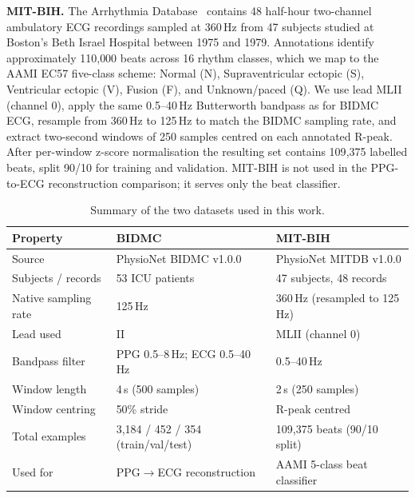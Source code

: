 \documentclass[11pt,a4paper]{article}
\begin{document}
\textbf{MIT-BIH.} The Arrhythmia Database~\cite{moody2001mitbih} contains 48 half-hour two-channel ambulatory ECG recordings sampled at 360\,Hz from 47 subjects studied at Boston's Beth Israel Hospital between 1975 and 1979. Annotations identify approximately 110{,}000 beats across 16 rhythm classes, which we map to the AAMI EC57 five-class scheme: Normal (N), Supraventricular ectopic (S), Ventricular ectopic (V), Fusion (F), and Unknown/paced (Q). We use lead MLII (channel 0), apply the same 0.5--40\,Hz Butterworth bandpass as for BIDMC ECG, resample from 360\,Hz to 125\,Hz to match the BIDMC sampling rate, and extract two-second windows of 250 samples centred on each annotated R-peak. After per-window z-score normalisation the resulting set contains 109{,}375 labelled beats, split 90/10 for training and validation. MIT-BIH is not used in the PPG-to-ECG reconstruction comparison; it serves only the beat classifier.

\begin{table}[H]
  \centering
  \caption{Summary of the two datasets used in this work.}
  \label{tab:data}
  \small
  \begin{tabular}{p{3.6cm} p{5.2cm} p{5.2cm}}
    \toprule
    \textbf{Property} & \textbf{BIDMC} & \textbf{MIT-BIH} \\
    \midrule
    Source              & PhysioNet BIDMC v1.0.0           & PhysioNet MITDB v1.0.0 \\
    Subjects / records  & 53 ICU patients                  & 47 subjects, 48 records \\
    Native sampling rate& 125\,Hz                          & 360\,Hz (resampled to 125\,Hz) \\
    Lead used           & II                               & MLII (channel 0) \\
    Bandpass filter     & PPG 0.5--8\,Hz; ECG 0.5--40\,Hz  & 0.5--40\,Hz \\
    Window length       & 4\,s (500 samples)               & 2\,s (250 samples) \\
    Window centring     & 50\% stride                      & R-peak centred \\
    Total examples      & 3{,}184 / 452 / 354 (train/val/test) & 109{,}375 beats (90/10 split) \\
    Used for            & PPG$\to$ECG reconstruction       & AAMI 5-class beat classifier \\
    \bottomrule
  \end{tabular}
\end{table}
\end{document}
